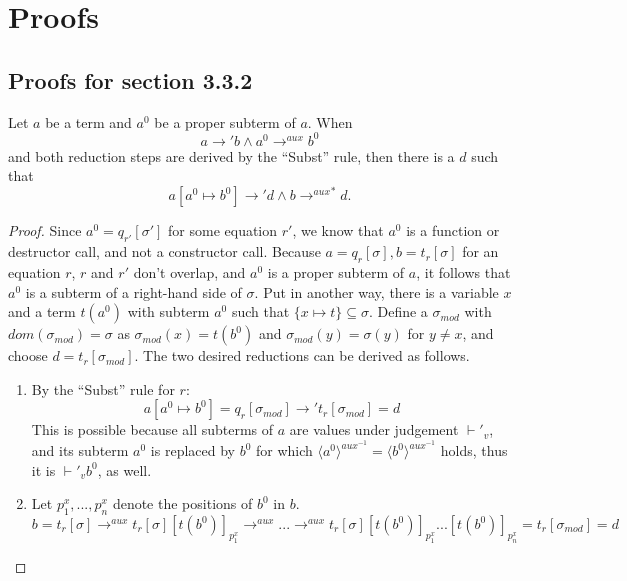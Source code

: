 \chapter{Proofs}

\section{Proofs for section 3.3.2}

\begin{lemma}
Let $a$ be a term and $a^0$ be a proper subterm of $a$. When
\[
a \longrightarrow' b \land a^0 \longrightarrow^{aux} b^0
\]
and both reduction steps are derived by the ``Subst'' rule, then there is a $d$ such that
\[
a[a^0 \mapsto b^0] \longrightarrow' d \land b {\longrightarrow^{aux}}^* d.
\]

\begin{proof}
Since $a^0 = q_{r'}[\sigma']$ for some equation $r'$, we know that $a^0$ is a function or destructor call, and not a constructor call. Because $a = q_r[\sigma], b = t_r[\sigma]$ for an equation $r$, $r$ and $r'$ don't overlap, and $a^0$ is a proper subterm of $a$, it follows that $a^0$ is a subterm of a right-hand side of $\sigma$. Put in another way, there is a variable $x$ and a term $t(a^0)$ with subterm $a^0$ such that $\{x \mapsto t\} \subseteq \sigma$. Define a $\sigma_{mod}$ with $dom(\sigma_{mod}) = \sigma$ as $\sigma_{mod}(x) = t(b^0)$ and $\sigma_{mod}(y) = \sigma(y)$ for $y \neq x$, and choose $d = t_r[\sigma_{mod}]$. The two desired reductions can be derived as follows.
\begin{enumerate}
\item By the ``Subst'' rule for $r$:
\[
a[a^0 \mapsto b^0] = q_r[\sigma_{mod}] \longrightarrow' t_r[\sigma_{mod}] = d
\]
This is possible because all subterms of $a$ are values under judgement $\vdash'_v$, and its subterm $a^0$ is replaced by $b^0$ for which $\langle a^0 \rangle^{aux^{-1}} = \langle b^0 \rangle^{aux^{-1}}$ holds, thus it is $\vdash'_v b^0$, as well.

\item Let $p^x_1, ..., p^x_n$ denote the positions of $b^0$ in $b$.
\[
b = t_r[\sigma] \longrightarrow^{aux} t_r[\sigma][t(b^0)]_{p^x_1} \longrightarrow^{aux} ... \longrightarrow^{aux} t_r[\sigma][t(b^0)]_{p^x_1}...[t(b^0)]_{p^x_n} = t_r[\sigma_{mod}] = d
\]
\end{enumerate}
\end{proof}
\end{lemma}

